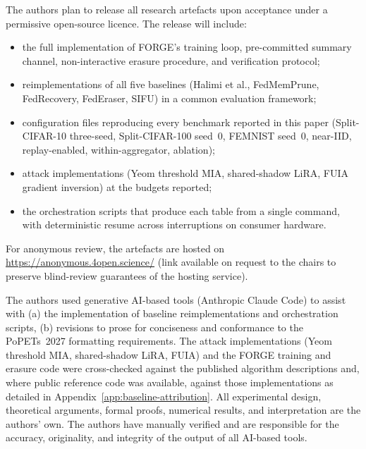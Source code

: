 \documentclass[sigconf,anonymous,review]{acmart}
\theoremstyle{definition}
\theoremstyle{remark}
\begin{document}
\begin{openscience}
The authors plan to release all research artefacts upon acceptance under a
permissive open-source licence. The release will include:
\begin{itemize}[leftmargin=*,itemsep=0pt]
  \item the full implementation of FORGE's training loop, pre-committed summary
  channel, non-interactive erasure procedure, and verification protocol;
  \item reimplementations of all five baselines (Halimi et al., FedMemPrune,
  FedRecovery, FedEraser, SIFU) in a common evaluation framework;
  \item configuration files reproducing every benchmark reported in this paper
  (Split-CIFAR-10 three-seed, Split-CIFAR-100 seed~0, FEMNIST seed~0, near-IID,
  replay-enabled, within-aggregator, ablation);
  \item attack implementations (Yeom threshold MIA, shared-shadow LiRA, FUIA
  gradient inversion) at the budgets reported;
  \item the orchestration scripts that produce each table from a single command,
  with deterministic resume across interruptions on consumer hardware.
\end{itemize}
For anonymous review, the artefacts are hosted on
\url{https://anonymous.4open.science/} (link available on request to the chairs
to preserve blind-review guarantees of the hosting service).
\end{openscience}

\begin{ai}
The authors used generative AI-based tools (Anthropic Claude Code) to assist
with (a) the implementation of baseline reimplementations and orchestration
scripts, (b) revisions to prose for conciseness and conformance to the
PoPETs~2027 formatting requirements. The attack implementations (Yeom
threshold MIA, shared-shadow LiRA, FUIA) and the FORGE training and erasure
code were cross-checked against the published algorithm descriptions and, where
public reference code was available, against those implementations as detailed
in Appendix~\ref{app:baseline-attribution}. All experimental design, theoretical
arguments, formal proofs, numerical results, and interpretation are the
authors' own. The authors have manually verified and are responsible for the
accuracy, originality, and integrity of the output of all AI-based tools.
\end{ai}




\appendix










\end{document}
